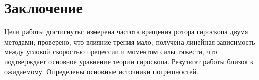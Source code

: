 \documentclass{article}
\begin{document}
\section*{Заключение}

\hspace{4mm} Цели работы достигнуты: измерена частота вращения ротора гироскопа двумя методами; проверено, что влияние трения мало; получена линейная зависимость между угловой скоростью прецессии и моментом силы тяжести, что подтверждает основное уравнение теории гироскопа. Результат работы близок к ожидаемому. Определены основные источники погрешностей.
\end{document}
